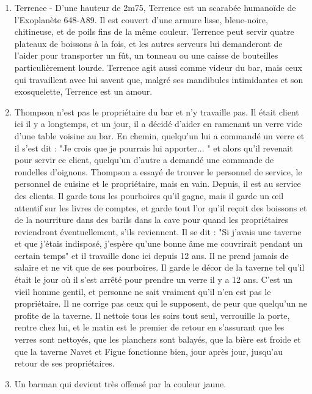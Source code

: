 \documentclass{article}
\begin{document}
\begin{enumerate}
	\item Terrence - D'une hauteur de 2m75, Terrence est un scarabée humanoïde de l'Exoplanète 648-A89. Il est couvert d'une armure lisse, bleue-noire, chitineuse, et de poils fins de la même couleur. Terrence peut servir quatre plateaux de boissons à la fois, et les autres serveurs lui demanderont de l'aider pour transporter un fût, un tonneau ou une caisse de bouteilles particulièrement lourde. Terrence agit aussi comme videur du bar, mais ceux qui travaillent avec lui savent que, malgré ses mandibules intimidantes et son exosquelette, Terrence est un amour.
	\item Thompson n'est pas le propriétaire du bar et n’y travaille pas. Il était client ici il y a longtemps, et un jour, il a décidé d'aider en ramenant un verre vide d'une table voisine au bar. En chemin, quelqu'un lui a commandé un verre et il s'est dit : "Je crois que je pourrais lui apporter... " et alors qu'il revenait pour servir ce client, quelqu'un d'autre a demandé une commande de rondelles d'oignons. Thompson a essayé de trouver le personnel de service, le personnel de cuisine et le propriétaire, mais en vain. Depuis, il est au service des clients. Il garde tous les pourboires qu'il gagne, mais il garde un œil attentif sur les livres de comptes, et garde tout l'or qu'il reçoit des boissons et de la nourriture dans des barils dans la cave pour quand les propriétaires reviendront éventuellement, s’ils reviennent. Il se dit : "Si j'avais une taverne et que j'étais indisposé, j'espère qu'une bonne âme me couvrirait pendant un certain temps" et il travaille donc ici depuis 12 ans. Il ne prend jamais de salaire et ne vit que de ses pourboires. Il garde le décor de la taverne tel qu'il était le jour où il s'est arrêté pour prendre un verre il y a 12 ans. C'est un vieil homme gentil, et personne ne sait vraiment qu'il n'en est pas le propriétaire. Il ne corrige pas ceux qui le supposent, de peur que quelqu'un ne profite de la taverne. Il nettoie tous les soirs tout seul, verrouille la porte, rentre chez lui, et le matin est le premier de retour en s'assurant que les verres sont nettoyés, que les planchers sont balayés, que la bière est froide et que la taverne Navet et Figue fonctionne bien, jour après jour, jusqu'au retour de ses propriétaires.
	\item Un barman qui devient très offensé par la couleur jaune.

\end{enumerate}
\end{document}

